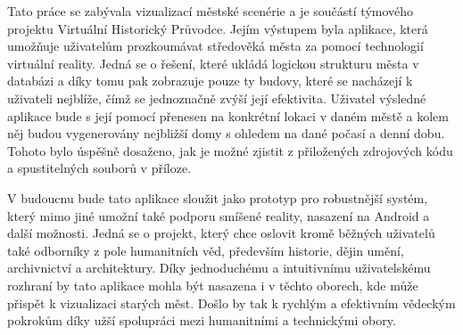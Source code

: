 \documentclass[thesis=B,czech]{FITthesis}[2012/06/26]
\begin{document}
\begin{conclusion}
	   
    Tato práce se zabývala vizualizací městské scenérie a je součástí týmového projektu Virtuální Historický Průvodce. Jejím výstupem byla aplikace, která umožňuje uživatelům prozkoumávat středověká města za pomocí technologií virtuální reality. Jedná se o řešení, které ukládá  logickou strukturu města v databázi a díky tomu pak zobrazuje pouze ty budovy, které se nacházejí k uživateli nejblíže, čímž se jednoznačně zvýší její efektivita. Uživatel výsledné aplikace bude s její pomocí přenesen na konkrétní lokaci v daném městě a kolem něj budou vygenerovány nejbližší domy s ohledem na dané počasí a denní dobu.  Tohoto bylo úspěšně dosaženo, jak je možné zjistit z přiložených zdrojových kódu a spustitelných souborů v příloze.
    
     V budoucnu bude tato aplikace sloužit jako prototyp pro robustnější systém, který mimo jiné umožní také podporu smíšené reality, nasazení na Android a další možnosti. Jedná se o projekt, který chce oslovit kromě běžných uživatelů také odborníky z pole humanitních věd, především historie, dějin umění, archivnictví a architektury. Díky jednoduchému a intuitivnímu uživatelskému rozhraní by tato aplikace mohla být nasazena i v těchto oborech, kde může přispět k vizualizaci starých měst. Došlo by tak k rychlým a efektivním vědeckým pokrokům díky užší spolupráci mezi humanitními a technickými obory.
\end{conclusion}

%
%
\end{document}
